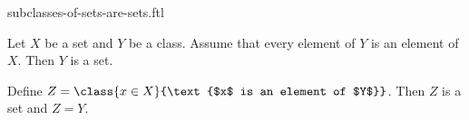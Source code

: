 \documentclass{stex}
\begin{document}
\begin{smodule}{subclasses-of-sets-are-sets.ftl}
  \begin{flemma*}
    Let $X$ be a set and $Y$ be a class.
    Assume that every element of $Y$ is an element of $X$.
    Then $Y$ is a set.
  \end{flemma*}
  \begin{fproof}
    Define $Z = \class{x \in X}{\text{$x$ is an element of $Y$}}$.
    Then $Z$ is a set and $Z = Y$.
  \end{fproof}
\end{smodule}
\end{document}
